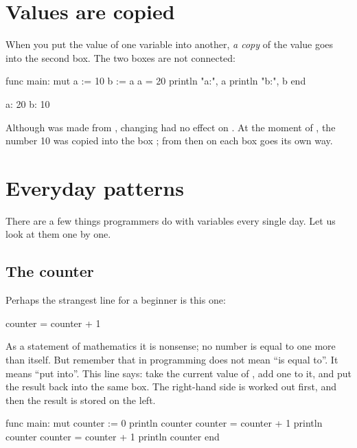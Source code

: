 \section{Values are copied}

When you put the value of one variable into another, \emph{a copy} of the
value goes into the second box. The two boxes are not connected:

\begin{salamcode}
func main:
    mut a := 10
    b := a
    a = 20
    println "a:", a
    println "b:", b
end
\end{salamcode}

\begin{salamout}
a: 20
b: 10
\end{salamout}

Although  was made from , changing  had no effect on
. At the moment of , the number 10 was copied into the
box ; from then on each box goes its own way.

\section{Everyday patterns}

There are a few things programmers do with variables every single day. Let
us look at them one by one.

\subsection{The counter}

Perhaps the strangest line for a beginner is this one:

\begin{salamcode}
counter = counter + 1
\end{salamcode}

As a statement of mathematics it is nonsense; no number is equal to one more
than itself. But remember that in programming \code{=} does not mean ``is
equal to''. It means ``put into''. This line says: take the current value of
, add one to it, and put the result back into the same box.
The right-hand side is worked out first, and then the result is stored on
the left.

\begin{salamcode}
func main:
    mut counter := 0
    println counter
    counter = counter + 1
    println counter
    counter = counter + 1
    println counter
end
\end{salamcode}

